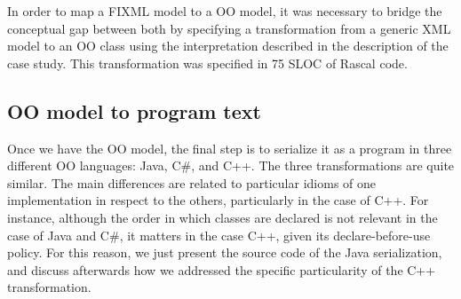 \documentclass[submission,copyright,creativecommons]{eptcs}
\begin{document}
In order to map a FIXML model to a OO model, it was necessary to bridge the conceptual gap between both by specifying a transformation from a generic XML model to an OO class using the interpretation described in the description of the case study. This transformation was specified in 75 SLOC of Rascal code.

\subsection{OO model to program text}

Once we have the OO model, the final step is to serialize it as a program in three different OO languages: Java, C\#, and C++. The three transformations are quite similar.
The main  differences  are related to particular idioms of one implementation in respect to the others, particularly in the case of C++. For instance, although the order in which classes are declared is not relevant in the case of Java and C\#, it  matters in the case C++, given its declare-before-use policy. For this reason, we just present the source code of the Java serialization, and discuss afterwards how we addressed the specific particularity of the C++ transformation.
\end{document}
